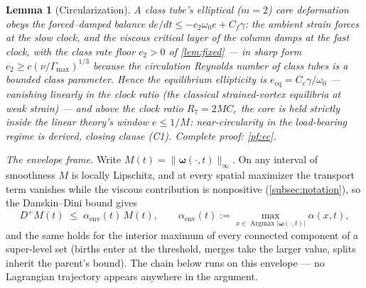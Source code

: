 \documentclass[11pt,letterpaper]{amsart}
\newtheorem{lemma}[theorem]{Lemma}
\theoremstyle{definition}
\theoremstyle{remark}
\newcommand{\om}{\omega}
\newcommand{\vort}{\boldsymbol{\omega}}
\newcommand{\norm}[1]{\lVert #1 \rVert}
\newcommand{\abs}[1]{\lvert #1 \rvert}
\begin{document}
\begin{lemma}[Circularization]\label{lem:ec}
A class tube's elliptical ($m=2$) core deformation obeys the forced--damped balance
$de/dt\le-c_2\om_0e+C_f\gamma$: the ambient strain forces at the slow clock, and the
viscous critical layer of the column damps at the fast clock, with the class rate
floor $c_2>0$ of \cref{lem:fixed} --- in sharp form
$c_2\ge c(\nu/\Gamma_{\max})^{1/3}$ \cite{LiWeiZhang2020,Gallay2018} because the circulation Reynolds number of class
tubes is a bounded class parameter. Hence the equilibrium ellipticity is
$e_{\mathrm{eq}}=C_e\gamma/\om_0$ --- vanishing linearly in the clock ratio (the
classical strained-vortex equilibria \cite{MooreSaffman1971,Kida1981} at weak strain)
--- and above the clock ratio $R_7=2MC_e$ the core is held strictly inside the linear
theory's window $e\le1/M$: near-circularity in the load-bearing regime is
\emph{derived}, closing clause \textup{(C1)}. Complete proof: \cref{pf:ec}.
\end{lemma}

\emph{The envelope frame.} Write $M(t)=\norm{\vort(\cdot,t)}_\infty$. On any
interval of smoothness $M$ is locally Lipschitz, and at every spatial maximizer the
transport term vanishes while the viscous contribution is nonpositive
(\cref{subsec:notation}), so the Danskin--Dini bound gives
\[
D^+M(t)\;\le\;\alpha_{\mathrm{env}}(t)\,M(t),
\qquad
\alpha_{\mathrm{env}}(t):=\max_{x\in\operatorname{Argmax}\abs{\vort(\cdot,t)}}\alpha(x,t),
\]
and the same holds for the interior maximum of every connected component of a
super-level set (births enter at the threshold, merges take the larger value, splits
inherit the parent's bound). The chain below runs on this envelope --- no Lagrangian
trajectory appears anywhere in the argument.
\end{document}
